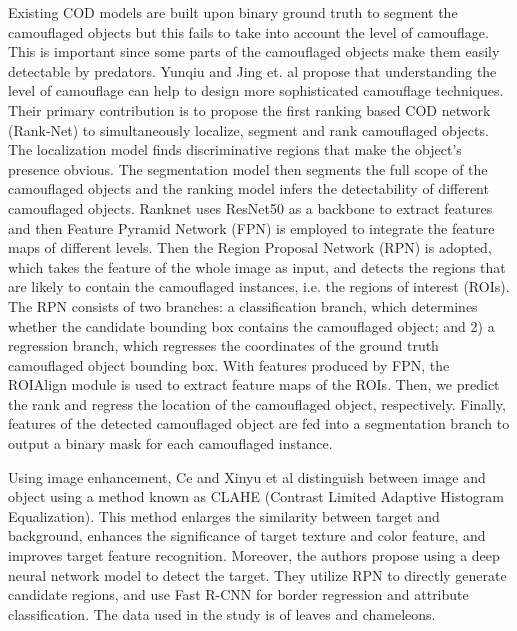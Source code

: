\documentclass[conference]{IEEEtran}
\begin{document}
Existing COD models are built upon binary ground truth to segment the camouflaged objects but this fails to take into account the level of camouflage. This is important since some parts of the camouflaged objects make them easily detectable by predators.  Yunqiu and Jing et. al \cite{lv2021simultaneously} propose that understanding the level of camouflage can help to design more sophisticated camouflage techniques. Their primary contribution  is to propose the first ranking based COD network (Rank-Net) to simultaneously localize, segment and rank camouflaged objects. The localization model finds discriminative regions that make the object's presence obvious. The segmentation model then segments the full scope of the camouflaged objects and the ranking model infers the detectability of different camouflaged objects. Ranknet uses ResNet50 as a backbone to extract features and then Feature Pyramid Network (FPN)  is employed to integrate the feature maps of different levels. Then the Region Proposal Network (RPN) is adopted, which takes the feature of the whole image as input, and detects the regions that are likely to contain the camouflaged instances, i.e. the regions of interest (ROIs). The RPN consists of two branches: a classification branch, which determines whether the candidate bounding box contains the camouflaged object; and 2) a regression branch, which regresses the coordinates of the ground truth camouflaged object bounding box. With features produced by FPN, the ROIAlign module is used to extract feature maps of the ROIs. Then, we predict the rank and regress the location of the camouflaged object, respectively. Finally, features of the detected camouflaged object are fed into a segmentation branch to output a binary mask for each camouflaged instance.

Using image enhancement, Ce and Xinyu et al \cite{last} distinguish between image and object using a method known as CLAHE (Contrast Limited Adaptive Histogram Equalization). This method enlarges the similarity between target and background, enhances the significance of target texture and color feature, and improves target feature recognition. Moreover, the authors propose using a deep neural network model to detect the target. They utilize RPN to directly generate candidate regions, and use Fast R-CNN for border regression and attribute classification. The data used in the study is of leaves and chameleons.
\end{document}
